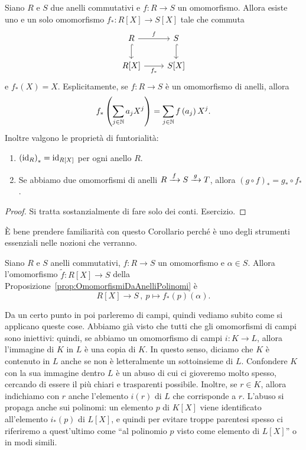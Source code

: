 \begin{coro}
Siano \(R\) e \(S\) due anelli commutativi e \(f : R \to S\) un omomorfismo. Allora esiste uno e un solo omomorfismo \(f_\ast : R[X] \to S[X]\) tale che commuta
\[\begin{tikzcd}
R \ar[hookrightarrow, d] \ar["f", r] & S \ar[hookrightarrow,d]   \\
R[X] \ar["{f_\ast}", r, swap] &             S[X]
\end{tikzcd}\]
e \(f_\ast(X) = X\). Esplicitamente, se \(f : R \to S\) è un omomorfismo di anelli, allora %
\[f_\ast \left( \sum_{j \in \mathbb{N}} a_j X^j \right) = \sum_{j \in \mathbb{N}} f\left(a_j\right) X^j .\]
Inoltre valgono le proprietà di funtorialità:
\begin{enumerate}
\item \(\left(\mathrm{id}_R\right)_\ast = \mathrm{id}_{R[X]}\) per ogni anello \(R\).
\item Se abbiamo due omomorfismi di anelli \(R \xrightarrow{\,f\,} S \xrightarrow{\,g\,} T\), allora \((g \circ f)_\ast = g_\ast \circ f_\ast\).
\end{enumerate}
\end{coro}

\begin{proof}
Si tratta sostanzialmente di fare solo dei conti. Esercizio.
\end{proof}

È bene prendere familiarità con questo Corollario perché è uno degli strumenti essenziali nelle nozioni che verranno.

\begin{coro}
Siano \(R\) e \(S\) anelli commutativi, \(f : R \to S\) un omomorfismo e \(\alpha \in S\). Allora l'omomorfismo \(\tilde f : R[X] \to S\) della Proposizione~\ref{prop:OmomorfismiDaAnelliPolinomi} è
\[R[X] \to S\,,\ p \mapsto f_\ast(p)(\alpha) .\]
\end{coro}

Da un certo punto in poi parleremo di campi, quindi vediamo subito come si applicano queste cose. Abbiamo già visto che tutti che gli omomorfismi di campi sono iniettivi: quindi, se abbiamo un omomorfismo di campi \(i : K \to L\), allora l'immagine di \(K\) in \(L\) è una copia di \(K\). In questo senso, diciamo che \(K\) è contenuto in \(L\) anche se non è letteralmente un sottoinsieme di \(L\). Confondere \(K\) con la sua immagine dentro \(L\) è un abuso di cui ci gioveremo molto spesso, cercando di essere il più chiari e trasparenti possibile. Inoltre, se \(r \in K\), allora indichiamo con \(r\) anche l'elemento \(i(r)\) di \(L\) che corrisponde a \(r\). L'abuso si propaga anche sui polinomi: un elemento \(p\) di \(K[X]\) viene identificato all'elemento \(i_\ast(p)\) di \(L[X]\), e quindi per evitare troppe parentesi spesso ci riferiremo a quest'ultimo come \enquote{al polinomio \(p\) visto come elemento di \(L[X]\)} o in modi simili. 

